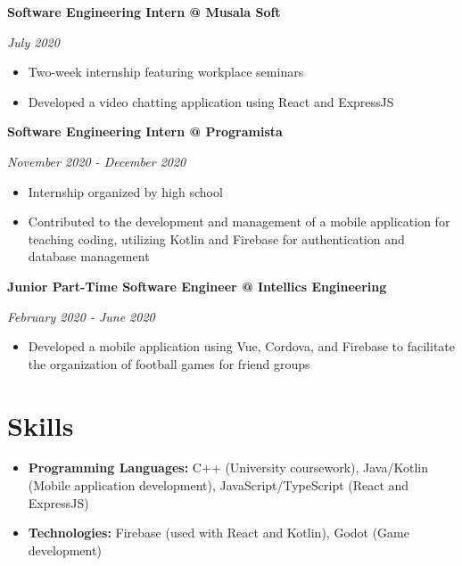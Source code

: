 \documentclass[a4paper,10pt]{article}
\begin{document}
\textbf{Software Engineering Intern @ Musala Soft}

\textit{July 2020}
\begin{itemize}
    \item Two-week internship featuring workplace seminars
    \item Developed a video chatting application using React and ExpressJS
\end{itemize}

\textbf{Software Engineering Intern @ Programista}

\textit{November 2020 - December 2020}
\begin{itemize}
    \item Internship organized by high school
    \item Contributed to the development and management of a mobile application for teaching coding, utilizing Kotlin and Firebase for authentication and database management
\end{itemize}

\textbf{Junior Part-Time Software Engineer @ Intellics Engineering}

\textit{February 2020 - June 2020}
\begin{itemize}
    \item Developed a mobile application using Vue, Cordova, and Firebase to facilitate the organization of football games for friend groups
\end{itemize}

\section*{Skills}

\begin{itemize}
    \item \textbf{Programming Languages:} C++ (University coursework), Java/Kotlin (Mobile application development), JavaScript/TypeScript (React and ExpressJS)
    \item \textbf{Technologies:} Firebase (used with React and Kotlin), Godot (Game development)
\end{itemize}
\end{document}
